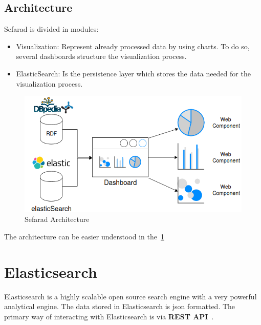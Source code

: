 \subsection{Architecture}
Sefarad is divided in modules:
\begin{itemize}
    \item Visualization: Represent already processed data by using charts. To do so, several dashboards structure the visualization process.
    \item ElasticSearch: Is the persistence layer which stores the data needed for the visualization process.
\end{itemize}
\begin{figure}
  \includegraphics[width=\linewidth]{img/sefarad_architecture.png}
  \caption{Sefarad Architecture~\cite{sefarad}}
  \label{fig:sefaradarch}
\end{figure}
The architecture can be easier understood in the~\cref{fig:sefaradarch}
\section{Elasticsearch}
Elasticsearch is a highly scalable open source search engine with a very powerful analytical engine. The data stored in Elasticsearch is \ac{json} formatted. The primary way of interacting with Elasticsearch is via \textbf{REST API}~\cite{elastic1}.
